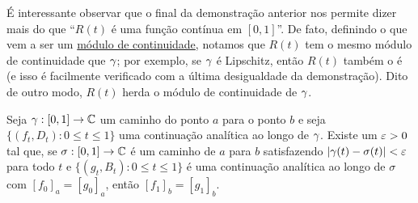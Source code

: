     É interessante observar que o final da demonstração anterior nos permite dizer
    mais do que ``$R(t)$ é uma função contínua em $[0,1]$''. De fato, definindo o que
    vem a ser um 
    \href{%
        https://en.wikipedia.org/wiki/Modulus_of_continuity
    }{módulo de continuidade},
    notamos que $R(t)$ tem o mesmo módulo de continuidade que $\gamma$; por exemplo, se
    $\gamma$ é Lipschitz, então $R(t)$ também o é 
    (e isso é facilmente verificado com a última desigualdade da demonstração).
    Dito de outro modo, $R(t)$ herda o módulo de continuidade de $\gamma$.

    \begin{lema}
    \label{lema-ext-epsilon-proximas}
        Seja $\gamma: [0,1] \to \mathbb{C}$ um caminho do ponto $a$ para o ponto $b$ e seja
        $\{(f_t, D_t): 0 \leq t \leq 1\}$ uma continuação analítica ao longo de $\gamma$. 
        Existe um $\varepsilon > 0$ tal que, se $\sigma :[0,1] \to \mathbb{C}$ é um caminho 
        de $a$ para $b$ satisfazendo $|\gamma(t) - \sigma(t)| < \varepsilon$ para todo $t$ 
        e $\{(g_t, B_t): 0 \leq t \leq 1\}$ é uma continuação analítica ao longo de $\sigma$ 
        com $[f_0]_a = [g_0]_a$, então $[f_1]_b = [g_1]_b$.
    \end{lema}

